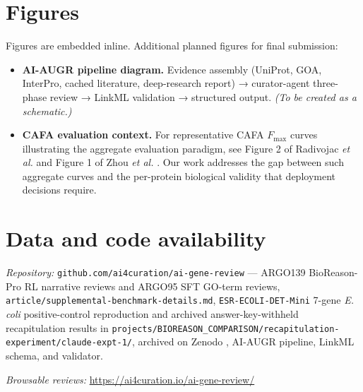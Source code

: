 \documentclass[
  11pt,
]{article}
\providecommand{\tightlist}{%
  \setlength{\itemsep}{0pt}\setlength{\parskip}{0pt}}
\begin{document}
\hypertarget{figures}{%
\section{Figures}\label{figures}}

Figures are embedded inline. Additional planned figures for final
submission:

\begin{itemize}
\tightlist
\item
  \textbf{AI-AUGR pipeline diagram.} Evidence assembly (UniProt, GOA,
  InterPro, cached literature, deep-research report) → curator-agent
  three-phase review → LinkML validation → structured output. \emph{(To
  be created as a schematic.)}
\item
  \textbf{CAFA evaluation context.} For representative CAFA \(F_{\max}\)
  curves illustrating the aggregate evaluation paradigm, see Figure 2 of
  Radivojac \emph{et al.} \cite{radivojac2013} and Figure 1 of Zhou \emph{et al.}
  \cite{zhou2019}. Our work addresses the gap between such aggregate curves and
  the per-protein biological validity that deployment decisions require.
\end{itemize}

\hypertarget{data-and-code-availability}{%
\section{Data and code
availability}\label{data-and-code-availability}}

\emph{Repository:} \texttt{github.com/ai4curation/ai-gene-review} ---
ARGO139 BioReason-Pro RL narrative reviews and ARGO95 SFT GO-term reviews,
\texttt{article/supplemental-benchmark-details.md},
\texttt{ESR-ECOLI-DET-Mini} 7-gene \emph{E. coli} positive-control
reproduction and archived answer-key-withheld recapitulation results in
\texttt{projects/BIOREASON\_COMPARISON/recapitulation-experiment/claude-expt-1/},
archived on Zenodo \cite{mungall2026esrecolidetmini}, AI-AUGR pipeline,
LinkML schema, and validator.

\emph{Browsable reviews:}
\url{https://ai4curation.io/ai-gene-review/}



\end{document}
